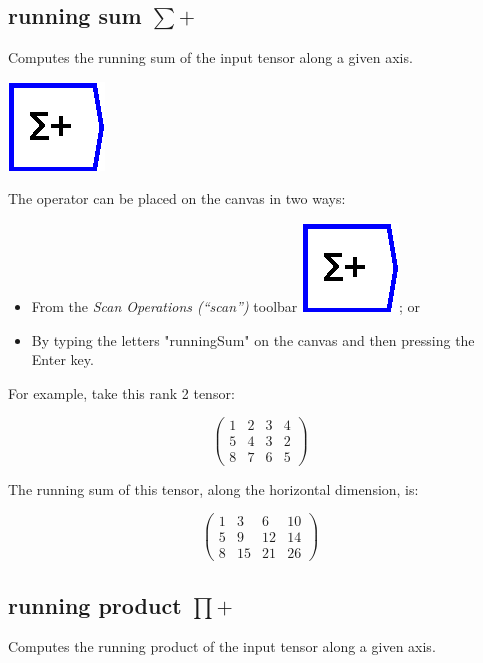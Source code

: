 \subsection{running sum $\sum+$}

\label{Operation:runningSum} Computes the running sum of the input
tensor along a given axis.

\includegraphics{images/runningSum}

The operator can be placed on the canvas in two ways:
\begin{itemize}
\item From the \emph{Scan Operations (``scan'') }toolbar \includegraphics{images/runningSum};
or 
\item By typing the letters "runningSum" on the canvas and then pressing
the Enter key.
\end{itemize}
For example, take this rank 2 tensor:

\[
\left(\begin{array}{cccc}
1 & 2 & 3 & 4\\
5 & 4 & 3 & 2\\
8 & 7 & 6 & 5
\end{array}\right)
\]

The running sum of this tensor, along the horizontal dimension, is:

\[
\left(\begin{array}{cccc}
1 & 3 & 6 & 10\\
5 & 9 & 12 & 14\\
8 & 15 & 21 & 26
\end{array}\right)
\]


\subsection{running product $\prod+$}

\label{Operation:runningProduct} Computes the running product of
the input tensor along a given axis.

